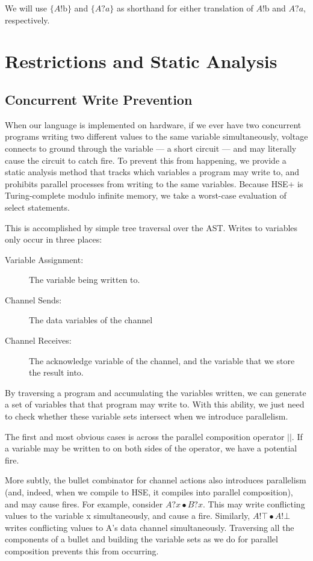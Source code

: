 \documentclass[times, 10pt]{article}
\begin{document}
We will use $\{A!\mathrm{b}\}$ and $\{A?a\}$ as shorthand for either translation
of $A!\mathrm{b}$ and $A?a$, respectively.

\section{Restrictions and Static Analysis}

\subsection{Concurrent Write Prevention}

When our language is implemented on hardware, if we ever have two concurrent
programs writing two different values to the same variable simultaneously,
voltage connects to ground through the variable --- a short circuit --- and may
literally cause the circuit to catch fire.  To prevent this from happening, we
provide a static analysis method that tracks which variables a program may write
to, and prohibits parallel processes from writing to the same variables.
Because HSE+ is Turing-complete modulo infinite memory, we take a worst-case
evaluation of select statements.

This is accomplished by simple tree traversal over the AST.  Writes to variables
only occur in three places:

\begin{description}
\item[Variable Assignment:] The variable being written to.
\item[Channel Sends:] The data variables of the channel
\item[Channel Receives:] The acknowledge variable of the channel, and the
variable that we store the result into.
\end{description}

By traversing a program and accumulating the variables written, we can generate
a set of variables that that program may write to.  With this ability, we just
need to check whether these variable sets intersect when we introduce
parallelism.

The first and most obvious cases is across the parallel composition operator
$||$.  If a variable may be written to on both sides of the operator, we have a
potential fire.

More subtly, the bullet combinator for channel actions also introduces
parallelism (and, indeed, when we compile to HSE, it compiles into parallel
composition), and may cause fires.  For example, consider $A?x \bullet B?x$.
This may write conflicting values to the variable x simultaneously, and cause a
fire.  Similarly, $A!\top \bullet A!\bot$ writes conflicting values to A's data
channel simultaneously.  Traversing all the components of a bullet and building
the variable sets as we do for parallel composition prevents this from occurring.
\end{document}

